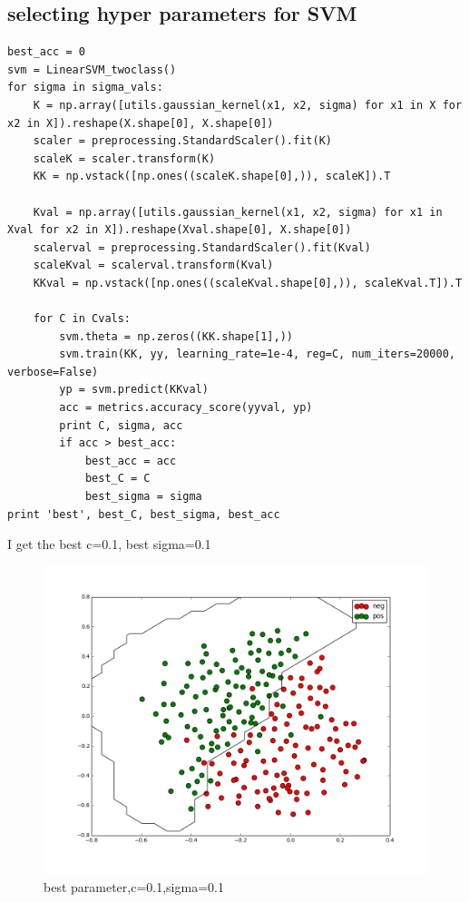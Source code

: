 \documentclass[pdftex,11pt]{article}
\begin{document}
\subsection{selecting hyper parameters for SVM}
\begin{lstlisting}
best_acc = 0
svm = LinearSVM_twoclass()
for sigma in sigma_vals:
    K = np.array([utils.gaussian_kernel(x1, x2, sigma) for x1 in X for x2 in X]).reshape(X.shape[0], X.shape[0])
    scaler = preprocessing.StandardScaler().fit(K)
    scaleK = scaler.transform(K)
    KK = np.vstack([np.ones((scaleK.shape[0],)), scaleK]).T

    Kval = np.array([utils.gaussian_kernel(x1, x2, sigma) for x1 in Xval for x2 in X]).reshape(Xval.shape[0], X.shape[0])
    scalerval = preprocessing.StandardScaler().fit(Kval)
    scaleKval = scalerval.transform(Kval)
    KKval = np.vstack([np.ones((scaleKval.shape[0],)), scaleKval.T]).T

    for C in Cvals:
        svm.theta = np.zeros((KK.shape[1],))
        svm.train(KK, yy, learning_rate=1e-4, reg=C, num_iters=20000, verbose=False)
        yp = svm.predict(KKval)
        acc = metrics.accuracy_score(yyval, yp)
        print C, sigma, acc
        if acc > best_acc:
            best_acc = acc
            best_C = C
            best_sigma = sigma
print 'best', best_C, best_sigma, best_acc
\end{lstlisting}
I get the best c=0.1, best sigma=0.1

 \begin{figure}[H]
  \caption{best parameter,c=0.1,sigma=0.1}
  \centering
    \includegraphics[scale=0.5]{0101.png}
\end{figure}
\end{document}
